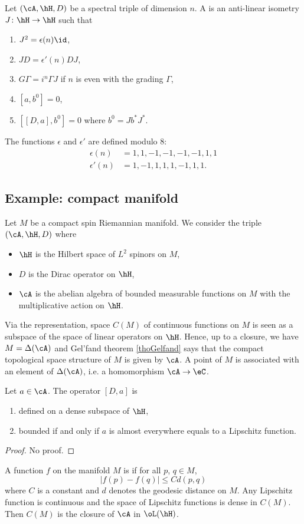 Let $(\cA,\hH,D)$ be a spectral triple of dimension $n$. A  is an anti-linear isometry $J\colon \hH\to \hH$ such that
\begin{enumerate}
\item $J^2=\epsilon(n)\id$,
\item $JD=\epsilon'(n)DJ$,
\item $G\Gamma=i^n\Gamma J$ if $n$ is even with the grading $\Gamma$,
\item $[a,b^0]=0$,
\item $[ [D,a],b^0 ]=0$ where $b^0=Jb^*J^*$.
\end{enumerate}
The functions $\epsilon$ and $\epsilon'$ are defined modulo $8$: 
\[ 
\begin{split}
\epsilon(n)&=1,1,-1,-1,-1,-1,1,1\\
\epsilon'(n)&=1,-1,1,1,1,-1,1,1.
\end{split}  
\]

\subsection{Example: compact manifold}

Let $M$ be a compact spin Riemannian manifold. We consider the triple $(\cA,\hH,D)$ where 
\begin{itemize}
\item $\hH$ is the Hilbert space of $L^2$ spinors on $M$,
\item $D$ is the Dirac operator on $\hH$,
\item $\cA$ is the abelian algebra of bounded measurable functions on $M$ with the multiplicative action on $\hH$.
\end{itemize}
Via the representation, space $C(M)$ of continuous functions on $M$ is seen as a subspace of the space of linear operators on $\hH$. Hence, up to a closure, we have $M=\Delta(\cA)$ and Gel'fand theorem \ref{thoGelfand} says that the compact topological space structure of $M$ is given by $\cA$. A point of $M$ is associated with an element of $\Delta(\cA)$, i.e. a homomorphism $\cA\to\eC$.

\begin{proposition}
Let $a\in\cA$. The operator $[D,a]$ is
\begin{enumerate}
\item defined on a dense subspace of $\hH$,
\item bounded if and only if $a$ is almost everywhere equals to a Lipschitz function.
\end{enumerate}

\end{proposition}
\begin{proof}
No proof.
\end{proof}

A function $f$ on the manifold $M$ is  if for all $p$, $q\in M$,
\[ 
  | f(p)-f(q) |\leq C d(p,q)
\]
where $C$ is a constant and $d$ denotes the geodesic distance on $M$. Any Lipschitz function is continuous and the space of Lipschitz functions is dense in $C(M)$. Then $C(M)$ is the closure of $\cA$ in $\oL(\hH)$.
